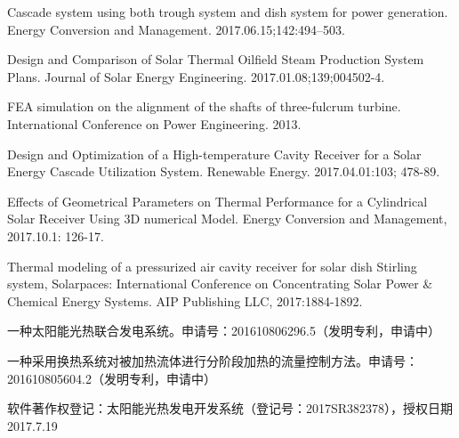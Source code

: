 \begin{publications}
  \item Cascade system using both trough system and dish system for power generation. Energy Conversion and Management. 2017.06.15;142:494–503.
  \item Design and Comparison of Solar Thermal Oilfield Steam Production System Plans. Journal of Solar Energy Engineering. 2017.01.08;139;004502-4.
  \item FEA simulation on the alignment of the shafts of three-fulcrum turbine. International Conference on Power Engineering. 2013.
  \item Design and Optimization of a High-temperature Cavity Receiver for a Solar Energy Cascade Utilization System. Renewable Energy. 2017.04.01:103; 478-89. 
  \item Effects of Geometrical Parameters on Thermal Performance for a Cylindrical Solar Receiver Using 3D numerical Model. Energy Conversion and Management, 2017.10.1: 126-17.
  \item Thermal modeling of a pressurized air cavity receiver for solar dish Stirling system, Solarpaces: International Conference on Concentrating Solar Power \& Chemical Energy Systems. AIP Publishing LLC, 2017:1884-1892.
  
  \item 一种太阳能光热联合发电系统。申请号：201610806296.5（发明专利，申请中）
  \item 一种采用换热系统对被加热流体进行分阶段加热的流量控制方法。申请号：201610805604.2（发明专利，申请中）
  \item 软件著作权登记：太阳能光热发电开发系统（登记号：2017SR382378），授权日期2017.7.19
  
\end{publications}
